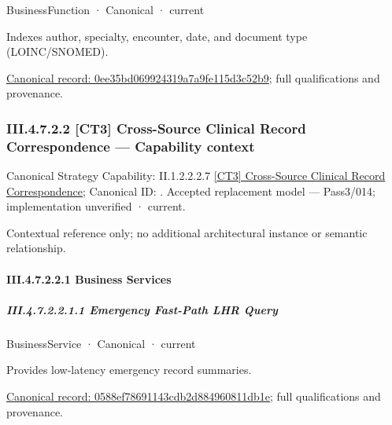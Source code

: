 \label{element:0ee35bd069924319a7a9fe115d3c52b9}
{\small BusinessFunction · Canonical · current}\par

Indexes author, specialty, encounter, date, and document type (LOINC/SNOMED).


{\footnotesize \href{../../../../../../../../continuum/business/business-function/0ee35bd069924319a7a9fe115d3c52b9.md}{Canonical record: 0ee35bd069924319a7a9fe115d3c52b9}; full qualifications and provenance.}\par
\subsubsection*{III.4.7.2.2 [CT3] Cross-Source Clinical Record Correspondence — Capability context}
\label{navigation:III.4.7.2.2}

{\small Canonical Strategy Capability: II.1.2.2.2.7 \hyperref[element:08c8d56f6a1c45b4919e9579b3f695a0]{[CT3] Cross-Source Clinical Record Correspondence}; Canonical ID: \texttt{}. Accepted replacement model — Pass3/014; implementation unverified · current.}\par
Contextual reference only; no additional architectural instance or semantic relationship.\par
\paragraph*{III.4.7.2.2.1 Business Services}
\label{navigation:III.4.7.2.2.1}

\subparagraph*{III.4.7.2.2.1.1 Emergency Fast-Path LHR Query}
\label{navigation:III.4.7.2.2.1.1}

\label{element:0588ef78691143cdb2d884960811db1e}
{\small BusinessService · Canonical · current}\par

Provides low-latency emergency record summaries.


{\footnotesize \href{../../../../../../../../continuum/business/business-service/0588ef78691143cdb2d884960811db1e.md}{Canonical record: 0588ef78691143cdb2d884960811db1e}; full qualifications and provenance.}\par
